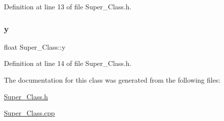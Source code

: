 Definition at line 13 of file Super\+\_\+\+Class.\+h.

\hypertarget{class_super___class_a340cf4d44abcfb96410f02adcb1d9208}{}\label{class_super___class_a340cf4d44abcfb96410f02adcb1d9208} 
\subsubsection{\texorpdfstring{y}{y}}
{\footnotesize\ttfamily float Super\+\_\+\+Class\+::y\hspace{0.3cm}{\ttfamily [protected]}}



Definition at line 14 of file Super\+\_\+\+Class.\+h.



The documentation for this class was generated from the following files\+:\begin{DoxyCompactItemize}
\item 
\hyperlink{_super___class_8h}{Super\+\_\+\+Class.\+h}\item 
\hyperlink{_super___class_8cpp}{Super\+\_\+\+Class.\+cpp}\end{DoxyCompactItemize}
